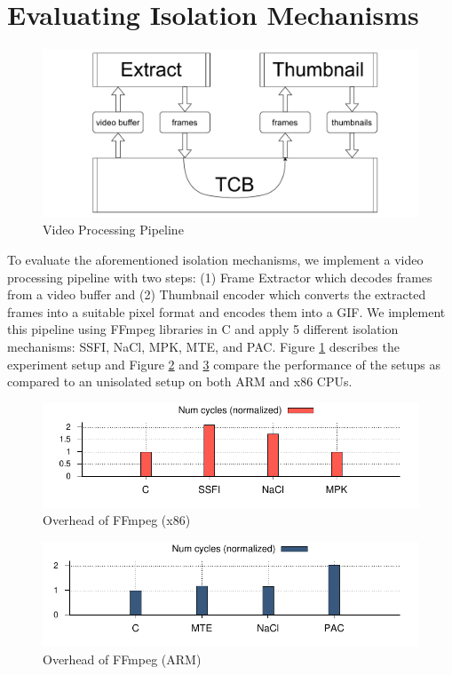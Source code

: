 \section{Evaluating Isolation Mechanisms}
\begin{figure}[!htbp]
\includegraphics[width=1.0\columnwidth]{figures/ffmpeg-pipeline.pdf}
\caption{Video Processing Pipeline}
\label{fig:ffmpeg-pipeline}
\end{figure}

To evaluate the aforementioned isolation mechanisms, we implement a video processing pipeline with two steps: (1) Frame Extractor which decodes frames from a video buffer and (2) Thumbnail encoder which converts the extracted frames into a suitable pixel format and encodes them into a GIF. We implement this pipeline using FFmpeg libraries in C and apply 5 different isolation mechanisms: SSFI, NaCl, MPK, MTE, and PAC. Figure \ref{fig:ffmpeg-pipeline} describes the experiment setup and Figure \ref{fig:ffmpeg-x86} and \ref{fig:ffmpeg-arm} compare the performance of the setups as compared to an unisolated setup on both ARM and x86 CPUs. 

\begin{figure}[!htbp]
	\includegraphics[width=1.0\columnwidth]{figures/ffmpeg-x86.pdf}
\caption{Overhead of FFmpeg (x86)}
	\label{fig:ffmpeg-x86}
\end{figure}

\begin{figure}[!htbp]
	\includegraphics[width=1.0\columnwidth]{figures/ffmpeg-arm.pdf}
\caption{Overhead of FFmpeg (ARM)}
	\label{fig:ffmpeg-arm}
\end{figure}

